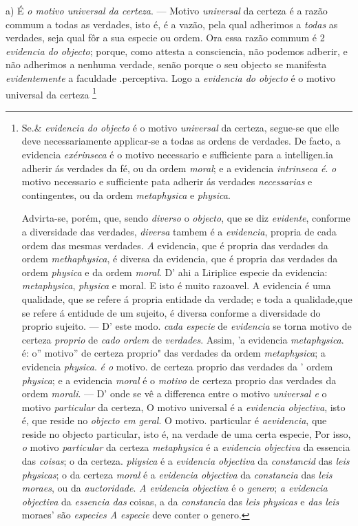 a) É \emph{o motivo universal da certeza}. --- Motivo \emph{universal} da certeza é a razão commum a todas as verdades, isto é, é a vazão, pela qual adherimos a \emph{todas} as verdades, seja qual fôr a sua especie ou ordem. Ora essa razão commum é 2 \emph{evidencia do objecto}; porque, como attesta a consciencia, não podemos adberir, e não adherimos a nenhuma verdade, senão porque o seu objecto se manifesta \emph{evidentemente} a faculdade .perceptiva. Logo a \emph{evidencia do objecto} é o motivo universal da certeza \footnote{Se.\& \emph{evidencia do objecto} é o motivo \emph{universal} da certeza, segue-se que elle deve necessariamente applicar-se a todas as ordens de verdades. De facto, a evidencia \emph{exérinseca} é o motivo necessario e sufficiente para a intelligen.ia adherir ás verdades da fé, ou da ordem \emph{moral}; e a evidencia \emph{intrinseca é}. \emph{o} motivo necessario e sufficiente pata adherir ás verdades \emph{necessarias} e contingentes, ou da ordem \emph{metaphysica} e \emph{physica}.\par Advirta-se, porém, que, sendo \emph{diverso} o \emph{objecto}, que se diz \emph{evidente}, conforme a diversidade das verdades, \emph{diversa} tambem é a \emph{evidencia}, propria de cada ordem das mesmas verdades. \emph{A} evidencia, que é propria das verdades da ordem \emph{methaphysica}, é diversa da evidencia, que é propria das verdades da ordem \emph{physica} e da ordem \emph{moral}. D' ahi a Liriplice especie da evidencia: \emph{metaphysica}, \emph{physica} e moral. E isto é muito razoavel. A evidencia é uma qualidade, que se refere á propria entidade da verdade; e toda a qualidade,que se refere á entidude de um sujeito, é diversa conforme a diversidade do proprio sujeito. --- D' este modo. \emph{cada especie} de \emph{evidencia} se torna motivo de certeza \emph{proprio} de \emph{cado ordem} de \emph{verdades}. Assim, 'a evidencia \emph{metaphysica}. é: o” motivo” de certeza proprio" das verdades da ordem \emph{metaphysica}; a evidencia \emph{physica}. \emph{é o} motivo. de certeza proprio das verdades da ' ordem \emph{physica}; e a evidencia \emph{moral} é o \emph{motivo} de certeza proprio das verdades da ordem \emph{morali}. --- D' onde se vê a differenca entre o motivo \emph{universal e} o motivo \emph{particular} da certeza, O motivo universal é a \emph{evidencia objectiva}, isto é, que reside no \emph{objecto em geral}. O motivo. particular é \emph{aevidencia}, que reside no objecto particular, isto é, na verdade de uma certa especie, Por isso, \emph{o} motivo \emph{particular} da certeza \emph{metaphysica} é a \emph{evidencia objectiva} da essencia das \emph{coisas}; o da certeza. \emph{pliysica} é a \emph{evidencia objectiva} da \emph{constancid} das \emph{leis physicas}; o da certeza \emph{moral} é a \emph{evidencia objectiva} da \emph{constancia} das \emph{leis moraes}, ou da \emph{auctoridade}. \emph{A evidencia objectiva} é o \emph{genero}; \emph{a evidencia objectiva} da \emph{essencia das} coisas, a da \emph{constancia} das \emph{leis physicas} e \emph{das leis} moraes' são \emph{especies A especie} deve conter o genero.}

